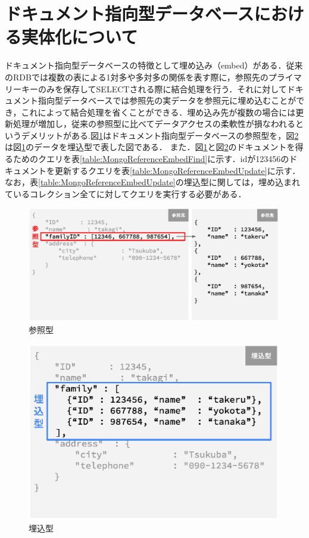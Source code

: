 \documentclass[a4paper,11pt]{ujreport}
\begin{document}
\section{ドキュメント指向型データベースにおける実体化について}
ドキュメント指向型データベースの特徴として埋め込み（embed）がある．従来のRDBでは複数の表による1対多や多対多の関係を表す際に，参照先のプライマリーキーのみを保存してSELECTされる際に結合処理を行う．それに対してドキュメント指向型データベースでは参照先の実データを参照元に埋め込むことができ，これによって結合処理を省くことができる．埋め込み先が複数の場合には更新処理が増加し，従来の参照型に比べてデータアクセスの柔軟性が損なわれるというデメリットがある\cite{Sky株式会社201212}.図\ref{figure:Reference}はドキュメント指向型データベースの参照型を，図\ref{figure:Embed}は図\ref{figure:Reference}のデータを埋込型で表した図である．
また．図\ref{figure:Reference}と図\ref{figure:Embed}のドキュメントを得るためのクエリを表\ref{table:MongoReferenceEmbedFind}に示す．idが123456のドキュメントを更新するクエリを表\ref{table:MongoReferenceEmbedUpdate}に示す．なお，表\ref{table:MongoReferenceEmbedUpdate}の埋込型に関しては，埋め込まれているコレクション全てに対してクエリを実行する必要がある．
\begin{figure}[htbp]
	\begin{center}
		\includegraphics[width=30em, trim=0 5em 0 2em]{src/Reference.eps} %
	\end{center}
	\caption{参照型}
	\label{figure:Reference}
\end{figure}
\begin{figure}[htbp]
	\begin{center}
		\includegraphics[width=30em, trim=0 7em 0 0em]{src/Embed.eps} %
	\end{center}
	\caption{埋込型}
	\label{figure:Embed}
\end{figure}
\end{document}
